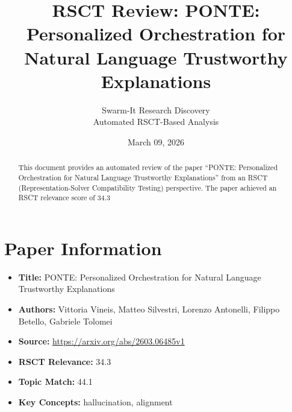 \documentclass[11pt,a4paper]{article}
\title{RSCT Review: PONTE: Personalized Orchestration for Natural Language Trustworthy Explanations}
\author{Swarm-It Research Discovery\\\small Automated RSCT-Based Analysis}
\date{March 09, 2026}
\begin{document}
\maketitle

\begin{abstract}
This document provides an automated review of the paper ``PONTE: Personalized Orchestration for Natural Language Trustworthy Explanations'' from an RSCT (Representation-Solver Compatibility Testing) perspective. The paper achieved an RSCT relevance score of 34.3%
\end{abstract}

\section{Paper Information}
\begin{itemize}
\item \textbf{Title:} PONTE: Personalized Orchestration for Natural Language Trustworthy Explanations
\item \textbf{Authors:} Vittoria Vineis, Matteo Silvestri, Lorenzo Antonelli, Filippo Betello, Gabriele Tolomei
\item \textbf{Source:} \url{https://arxiv.org/abs/2603.06485v1}
\item \textbf{RSCT Relevance:} 34.3%
\item \textbf{Topic Match:} 44.1%
\item \textbf{Key Concepts:} hallucination, alignment
\end{itemize}
\end{document}
